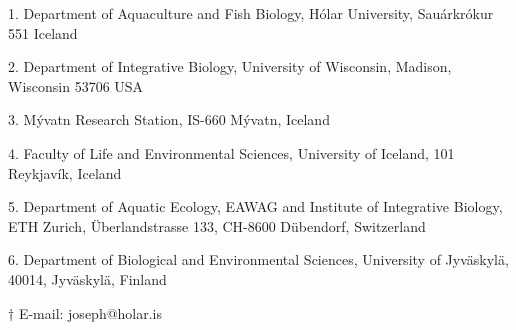 \author{
Joseph S. Phillips$^{1,2, \dagger}$ \\
\'{A}rni Einarsson$^{3,4}$ \\ 
Kasha Strickland$^{1}$ \\
Anthony R. Ives$^{2}$ \\
Bjarni K. Kristj\'{a}nsson$^{1}$ \\
Katja R\"{a}s\"{a}nen$^{5,6}$ 
}

\noindent{} 1. Department of Aquaculture and Fish Biology, 
H\'{o}lar University, Sau{\dh}\'{a}rkr\'{o}kur 551 Iceland

\noindent{} 2. Department of Integrative Biology, 
University of Wisconsin, Madison, Wisconsin 53706 USA

\noindent{} 3. M\'{y}vatn Research Station, IS-660 M\'{y}vatn, Iceland

\noindent{} 4. Faculty of Life and Environmental Sciences, 
              University of Iceland, 101 Reykjav\'{i}k, Iceland

\noindent{} 5. Department of Aquatic Ecology, EAWAG and 
Institute of Integrative Biology, ETH Zurich, 
\"{U}berlandstrasse 133, CH-8600 D\"{u}bendorf, Switzerland

\noindent{} 6. Department of Biological and Environmental Sciences, 
University of Jyv\"{a}skyl\"{a}, 40014, Jyv\"{a}skyl\"{a}, Finland

\noindent{} $\dagger$ E-mail: joseph@holar.is